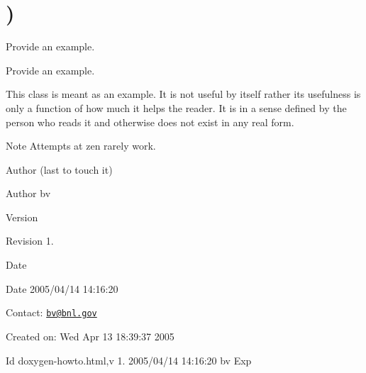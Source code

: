 \hypertarget{group__somewhere}{}\section{)}
\label{group__somewhere}


Provide an example.  


Provide an example. 

This class is meant as an example. It is not useful by itself rather its usefulness is only a function of how much it helps the reader. It is in a sense defined by the person who reads it and otherwise does not exist in any real form.

\begin{DoxyNote}{Note}
Attempts at zen rarely work.
\end{DoxyNote}
\begin{DoxyAuthor}{Author}
(last to touch it) 
\end{DoxyAuthor}
\begin{DoxyParagraph}{Author}
bv 
\end{DoxyParagraph}


\begin{DoxyVersion}{Version}

\end{DoxyVersion}
\begin{DoxyParagraph}{Revision}
1. 
\end{DoxyParagraph}


\begin{DoxyDate}{Date}

\end{DoxyDate}
\begin{DoxyParagraph}{Date}
2005/04/14 14\+:16\+:20 
\end{DoxyParagraph}


Contact\+: \href{mailto:bv@bnl.gov}{\tt bv@bnl.\+gov}

Created on\+: Wed Apr 13 18\+:39\+:37 2005

\begin{DoxyParagraph}{Id}
doxygen-\/howto.\+html,v 1. 2005/04/14 14\+:16\+:20 bv Exp 
\end{DoxyParagraph}
